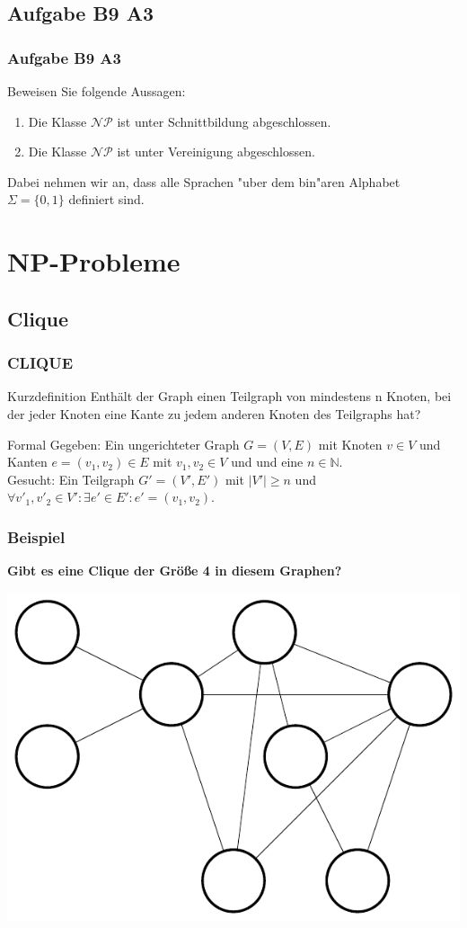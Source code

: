 \subsection{Aufgabe B9 A3}
\begin{frame}
	\frametitle{Aufgabe B9 A3}
	Beweisen Sie folgende Aussagen:
	\begin{enumerate}
	\item Die Klasse $\mathcal{NP}$ ist unter Schnittbildung abgeschlossen.
	\item Die Klasse $\mathcal{NP}$ ist unter Vereinigung abgeschlossen.
	\end{enumerate}
	Dabei nehmen wir an, dass alle Sprachen "uber dem bin"aren Alphabet $\Sigma =
	\{0,1\}$ definiert sind.
\end{frame}

\section{NP-Probleme}
\subsection{Clique}
\begin{frame}
	\frametitle{CLIQUE}
	\begin{block}{Kurzdefinition}
	Enthält der Graph einen Teilgraph von mindestens n Knoten, bei der jeder Knoten eine Kante zu jedem anderen Knoten des Teilgraphs hat?
	\end{block}
	\begin{block}{Formal}
	Gegeben: Ein ungerichteter Graph $G = (V,E)$ mit Knoten $v \in V$ und Kanten $e=(v_1, v_2)\in E$ mit $v_1, v_2 \in V$ und und eine $n \in \mathbb{N}$.\\
	Gesucht: Ein Teilgraph $G' = (V',E')$ mit $|V'|\ge n$ und $\forall v'_1, v'_2\in V':\exists e'\in E': e'=(v_1,v_2)$.
	\end{block}
\end{frame}
\begin{frame}
	\frametitle{Beispiel}
	\textbf{Gibt es eine Clique der Größe 4 in diesem Graphen?}
	\begin{center}
	\includegraphics[scale=0.6]{images/4CLIQUE}	
	\end{center}
\end{frame}
